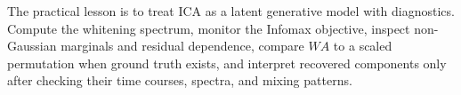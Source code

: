 The practical lesson is to treat ICA as a latent generative model with diagnostics. Compute the whitening spectrum, monitor the Infomax objective, inspect non-Gaussian marginals and residual dependence, compare \(WA\) to a scaled permutation when ground truth exists, and interpret recovered components only after checking their time courses, spectra, and mixing patterns.
